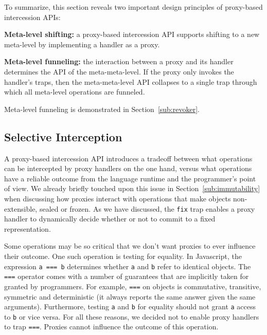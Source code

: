 \documentclass{sig-alternate}
\begin{document}
To summarize, this section reveals two important design principles of proxy-based intercession APIs:

\textbf{Meta-level shifting:} a proxy-based intercession API supports shifting to a new meta-level by implementing a handler as a proxy.

\textbf{Meta-level funneling:} the interaction between a proxy and its handler determines the API of the meta-meta-level. If the proxy only invokes the handler's traps, then the meta-meta-level API collapses to a single trap through which all meta-level operations are funneled.

Meta-level funneling is demonstrated in Section~\ref{sub:revoker}.



\subsection{Selective Interception}
\label{sub:selective}

A proxy-based intercession API introduces a tradeoff between what operations can be intercepted by proxy handlers on the one hand, versus what operations have a reliable outcome from the language runtime and the programmer's point of view. We already briefly touched upon this issue in Section~\ref{sub:immutability} when discussing how proxies interact with operations that make objects non-extensible, sealed or frozen. As we have discussed, the \texttt{fix} trap enables a proxy handler to dynamically decide whether or not to commit to a fixed representation.

Some operations may be so critical that we don't want proxies to ever influence their outcome. One such operation is testing for equality. In Javascript, the expression \texttt{a === b} determines whether \texttt{a} and \texttt{b} refer to identical objects. The \texttt{===} operator comes with a number of guarantees that are implicitly taken for granted by programmers. For example, \texttt{===} on objects is commutative, transitive, symmetric and deterministic (it always reports the same answer given the same arguments). Furthermore, testing \texttt{a} and \texttt{b} for equality should not grant \texttt{a} access to \texttt{b} or vice versa. For all these reasons, we decided not to enable proxy handlers to trap \texttt{===}. Proxies cannot influence the outcome of this operation.
\end{document}
